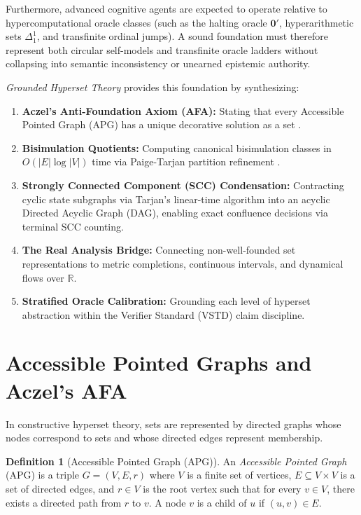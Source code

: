 \documentclass[11pt]{article}
\theoremstyle{definition}
\newtheorem{definition}[theorem]{Definition}
\newcommand{\R}{\mathbb R}
\begin{document}
Furthermore, advanced cognitive agents are expected to operate relative to hypercomputational oracle classes (such as the halting oracle $\mathbf{0}'$, hyperarithmetic sets $\Delta^1_1$, and transfinite ordinal jumps). A sound foundation must therefore represent both circular self-models and transfinite oracle ladders without collapsing into semantic inconsistency or unearned epistemic authority.

\emph{Grounded Hyperset Theory} provides this foundation by synthesizing:
\begin{enumerate}
\item \textbf{Aczel's Anti-Foundation Axiom (AFA):} Stating that every Accessible Pointed Graph (APG) has a unique decorative solution as a set \cite{aczel}.
\item \textbf{Bisimulation Quotients:} Computing canonical bisimulation classes in $O(|E| \log |V|)$ time via Paige-Tarjan partition refinement \cite{paige_tarjan}.
\item \textbf{Strongly Connected Component (SCC) Condensation:} Contracting cyclic state subgraphs via Tarjan's linear-time algorithm into an acyclic Directed Acyclic Graph (DAG), enabling exact confluence decisions via terminal SCC counting.
\item \textbf{The Real Analysis Bridge:} Connecting non-well-founded set representations to metric completions, continuous intervals, and dynamical flows over $\R$.
\item \textbf{Stratified Oracle Calibration:} Grounding each level of hyperset abstraction within the Verifier Standard (VSTD) claim discipline.
\end{enumerate}

\section{Accessible Pointed Graphs and Aczel's AFA}
In constructive hyperset theory, sets are represented by directed graphs whose nodes correspond to sets and whose directed edges represent membership.

\begin{definition}[Accessible Pointed Graph (APG)]
An \emph{Accessible Pointed Graph} (APG) is a triple $G = (V, E, r)$ where $V$ is a finite set of vertices, $E \subseteq V \times V$ is a set of directed edges, and $r \in V$ is the root vertex such that for every $v \in V$, there exists a directed path from $r$ to $v$. A node $v$ is a child of $u$ if $(u, v) \in E$.
\end{definition}
\end{document}
